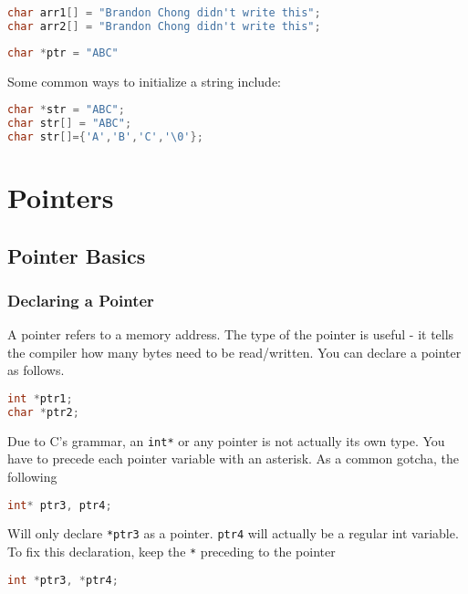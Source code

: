 \begin{lstlisting}[language=C]
char arr1[] = "Brandon Chong didn't write this";
char arr2[] = "Brandon Chong didn't write this";
\end{lstlisting}

\begin{lstlisting}[language=C]
char *ptr = "ABC"
\end{lstlisting}

Some common ways to initialize a string include:

\begin{lstlisting}[language=C]
char *str = "ABC";
char str[] = "ABC";
char str[]={'A','B','C','\0'};
\end{lstlisting}

\section{Pointers}

\subsection{Pointer Basics}

\subsubsection{Declaring a Pointer}

A pointer refers to a memory address. The type of the pointer is useful
- it tells the compiler how many bytes need to be read/written. You can
declare a pointer as follows.

\begin{lstlisting}[language=C]
int *ptr1;
char *ptr2;
\end{lstlisting}

Due to C's grammar, an \texttt{int*} or any pointer is not actually its
own type. You have to precede each pointer variable with an asterisk. As
a common gotcha, the following

\begin{lstlisting}[language=C]
int* ptr3, ptr4;
\end{lstlisting}

Will only declare \texttt{*ptr3} as a pointer. \texttt{ptr4} will
actually be a regular int variable. To fix this declaration, keep the
\texttt{*} preceding to the pointer

\begin{lstlisting}[language=C]
int *ptr3, *ptr4;
\end{lstlisting}

